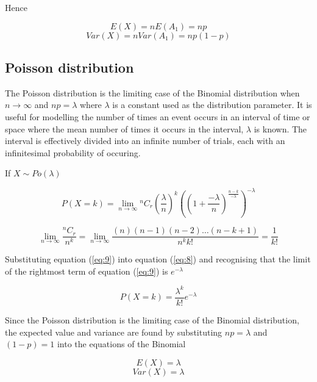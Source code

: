 \documentclass[a5paper]{article}
\begin{document}
Hence

\begin{equation}
  E(X) = nE(A_1) = np
\end{equation}
\begin{equation}
  Var(X) = nVar(A_1) = np(1-p)
\end{equation}

\subsection{Poisson distribution}

The Poisson distribution is the limiting case of the Binomial distribution when
$n\rightarrow\infty$ and $np = \lambda$ where $\lambda$ is a constant used as
the distribution parameter. It is useful for modelling the number of times an
event occurs in an interval of time or space where the mean number of times it
occurs in the interval, $\lambda$ is known. The interval is effectively divided
into an infinite number of trials, each with an infinitesimal probability of
occuring.

If $X\sim Po(\lambda)$

\begin{equation}\label{eq:8}
  P(X\!=\!k) = \lim_{n
    \rightarrow\infty}{}^nC_r\left(\frac{\lambda}{n}\right)^k
  \left(\left(1 + \frac{-\lambda}{n}\right)^{\frac{n-k}{-\lambda}}\right)^{-\lambda}
\end{equation}

\begin{equation}\label{eq:9}
  \lim_{n\rightarrow\infty}\frac{{}^nC_r}{n^k} =
  \lim_{n\rightarrow\infty}\frac{(n)(n-1)(n-2)\ldots(n-k+1)}{n^kk!} = \frac{1}{k!}
\end{equation}

Substituting equation (\ref{eq:9}) into equation (\ref{eq:8}) and recognising
that the limit of the rightmost term of equation (\ref{eq:9}) is $e^{-\lambda}$

\begin{equation}
  P(X\!=\!k) = \frac{\lambda^k}{k!}e^{-\lambda}
\end{equation}

Since the Poisson distribution is the limiting case of the Binomial
distribution, the expected value and variance are found by substituting $np =
\lambda$ and $(1-p) = 1$ into the equations of the Binomial

\begin{equation}
  E(X) = \lambda
\end{equation}
\begin{equation}
  Var(X) = \lambda
\end{equation}
\end{document}
